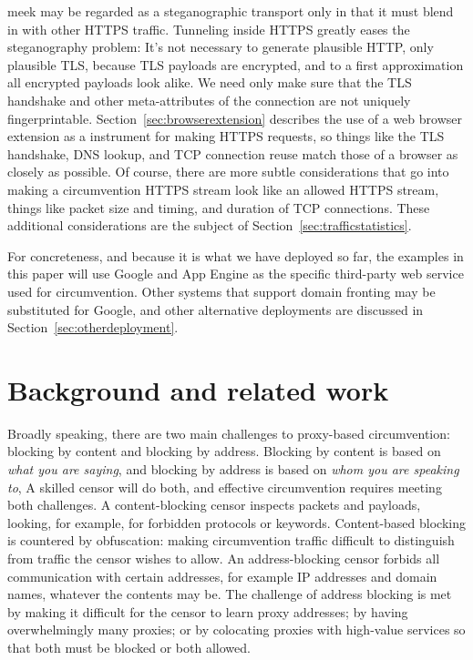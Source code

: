 \documentclass[conference]{IEEEtran}
\begin{document}
meek may be regarded as a steganographic transport only in that it must blend in with other HTTPS traffic.
Tunneling inside HTTPS greatly eases the steganography problem:
It's not necessary to generate plausible HTTP, only plausible TLS,
because TLS payloads are encrypted, and to a first approximation all encrypted payloads look alike.
We need only make sure that the TLS handshake and other meta-attributes of the connection are not uniquely fingerprintable.
Section~\ref{sec:browserextension} describes the use of a web browser extension as a instrument for making HTTPS requests,
so things like the TLS handshake, DNS lookup, and TCP connection reuse match those of a browser as closely as possible.
Of course, there are more subtle considerations that go into
making a circumvention HTTPS stream look like an allowed HTTPS stream,
things like packet size and timing, and duration of TCP connections.
These additional considerations are the subject of Section~\ref{sec:trafficstatistics}.

For concreteness, and because it is what we have deployed so far,
the examples in this paper will use Google and App Engine as the specific
third-party web service used for circumvention.
Other systems that support domain fronting may be substituted for Google,
and other alternative deployments are discussed in Section~\ref{sec:otherdeployment}.


\section{Background and related work}


Broadly speaking, there are two main challenges to proxy-based circumvention:
blocking by content and blocking by address.
Blocking by content is based on \emph{what you are saying},
and blocking by address is based on \emph{whom you are speaking to},
A skilled censor will do both, and effective circumvention requires meeting both challenges.
A content-blocking censor inspects packets and payloads,
looking, for example, for forbidden protocols or keywords.
Content-based blocking is countered by obfuscation:
making circumvention traffic difficult to distinguish
from traffic the censor wishes to allow.
An address-blocking censor forbids all communication with certain
addresses, for example IP addresses and domain names, whatever the contents may be.
The challenge of address blocking is met by making it difficult for the censor to learn proxy addresses;
by having overwhelmingly many proxies;
or by colocating proxies with high-value services so that both must be blocked or both allowed.
\end{document}
